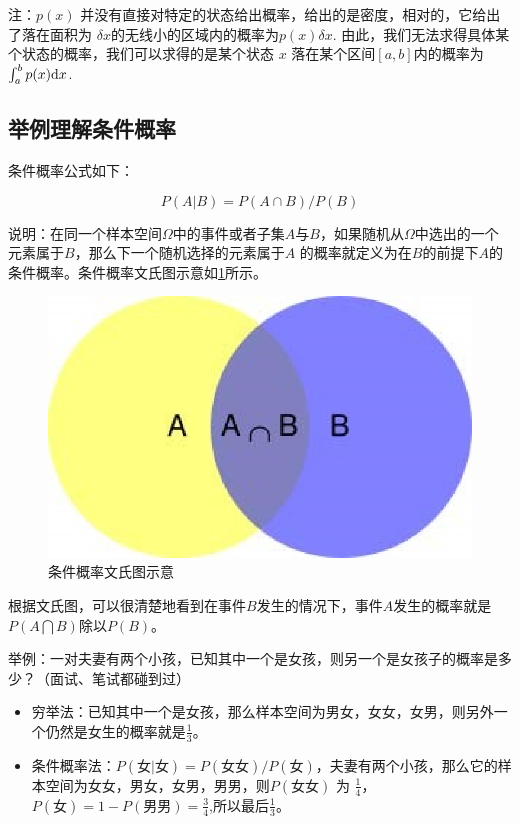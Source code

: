 注：$p(x)$ 并没有直接对特定的状态给出概率，给出的是密度，相对的，它给出了落在面积为 $\delta x$的无线小的区域内的概率为$p(x)\delta x$. 由此，我们无法求得具体某个状态的概率，我们可以求得的是某个状态 $x$ 落在某个区间$[a,b]$内的概率为$\int_{a}^{b}p(x)\mathrm{d}x$.


\subsection{举例理解条件概率}

条件概率公式如下：

$$
P(A|B) = P(A\cap B) / P(B)
$$

说明：在同一个样本空间$\Omega$中的事件或者子集$A$与$B$，如果随机从$\Omega$中选出的一个元素属于$B$，那么下一个随机选择的元素属于$A$ 的概率就定义为在$B$的前提下$A$的条件概率。条件概率文氏图示意如\ref{fig:1.1}所示。  

 \begin{figure}[h]
   \centering
   \includegraphics[width=.7\textwidth]{imgs/conditional_probability.eps}
   \caption{条件概率文氏图示意}
   \label{fig:1.1}
 \end{figure}

根据文氏图，可以很清楚地看到在事件$B$发生的情况下，事件$A$发生的概率就是$P(A\bigcap B)$除以$P(B)$。  

举例：一对夫妻有两个小孩，已知其中一个是女孩，则另一个是女孩子的概率是多少？（面试、笔试都碰到过）  

\begin{itemize}\itemsep0em
		\item 穷举法：已知其中一个是女孩，那么样本空间为男女，女女，女男，则另外一个仍然是女生的概率就是$\frac{1}{3}$。  
		\item 条件概率法：$P(\mbox{女}|\mbox{女})=P(\mbox{女女})/P(\mbox{女})$，夫妻有两个小孩，那么它的样本空间为女女，男女，女男，男男，则$P(\mbox{女女})$ 为 $\frac{1}{4}$，$P(\mbox{女})= 1-P(\mbox{男男})=\frac{3}{4}$,所以最后$\frac{1}{3}$。  
\end{itemize}

